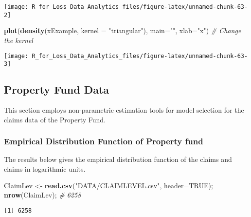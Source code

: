 \documentclass[]{book}
\newenvironment{Shaded}{\begin{snugshade}}{\end{snugshade}}
\newcommand{\KeywordTok}[1]{\textcolor[rgb]{0.13,0.29,0.53}{\textbf{#1}}}
\newcommand{\DataTypeTok}[1]{\textcolor[rgb]{0.13,0.29,0.53}{#1}}
\newcommand{\StringTok}[1]{\textcolor[rgb]{0.31,0.60,0.02}{#1}}
\newcommand{\CommentTok}[1]{\textcolor[rgb]{0.56,0.35,0.01}{\textit{#1}}}
\newcommand{\OtherTok}[1]{\textcolor[rgb]{0.56,0.35,0.01}{#1}}
\newcommand{\NormalTok}[1]{#1}
\theoremstyle{definition}
\theoremstyle{definition}
\theoremstyle{definition}
\theoremstyle{remark}
\begin{document}
\begin{center}\texttt{[image: R\_for\_Loss\_Data\_Analytics\_files/figure-latex/unnamed-chunk-63-2]} \end{center}

\begin{Shaded}
\begin{Highlighting}[]
\KeywordTok{plot}\NormalTok{(}\KeywordTok{density}\NormalTok{(xExample, }\DataTypeTok{kernel =} \StringTok{"triangular"}\NormalTok{), }\DataTypeTok{main=}\StringTok{""}\NormalTok{, }\DataTypeTok{xlab=}\StringTok{"x"}\NormalTok{) }\CommentTok{# Change the kernel}
\end{Highlighting}
\end{Shaded}

\begin{center}\texttt{[image: R\_for\_Loss\_Data\_Analytics\_files/figure-latex/unnamed-chunk-63-3]} \end{center}

\subsection{Property Fund Data}\label{property-fund-data}

This section employs non-parametric estimation tools for model selection
for the claims data of the Property Fund.

\subsubsection{Empirical Distribution Function of Property
fund}\label{empirical-distribution-function-of-property-fund}

The results below gives the empirical distribution function of the
claims and claims in logarithmic units.

\begin{Shaded}
\begin{Highlighting}[]
\NormalTok{ClaimLev <-}\StringTok{ }\KeywordTok{read.csv}\NormalTok{(}\StringTok{"DATA/CLAIMLEVEL.csv"}\NormalTok{, }\DataTypeTok{header=}\OtherTok{TRUE}\NormalTok{); }\KeywordTok{nrow}\NormalTok{(ClaimLev); }\CommentTok{# 6258}
\end{Highlighting}
\end{Shaded}

\begin{verbatim}
[1] 6258
\end{verbatim}
\end{document}
